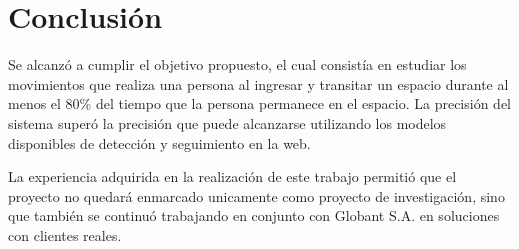 \documentclass[conference]{IEEEtran}
\begin{document}
\section{Conclusión}

Se alcanzó a cumplir el objetivo propuesto, el cual consistía en estudiar los movimientos que realiza una persona al ingresar y transitar un espacio durante al menos el 80\% del tiempo que la persona permanece en el espacio. La precisión del sistema superó la precisión que puede alcanzarse utilizando los modelos disponibles de detección y seguimiento en la web.

La experiencia adquirida en la realización de este trabajo permitió que el proyecto no quedará enmarcado unicamente como proyecto de investigación, sino que también se continuó trabajando en conjunto con Globant S.A.\cite{b22} en soluciones con clientes reales.
\end{document}
